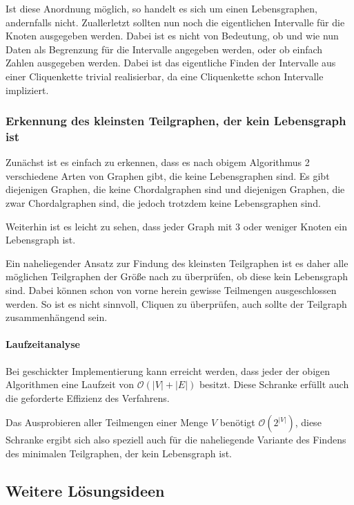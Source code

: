 Ist diese Anordnung möglich, so handelt es sich um einen Lebensgraphen, andernfalls nicht.
Zuallerletzt sollten nun noch die eigentlichen Intervalle für die Knoten ausgegeben werden. Dabei ist es nicht von Bedeutung, ob und wie nun Daten als Begrenzung für die Intervalle angegeben werden, oder ob einfach Zahlen ausgegeben werden. Dabei ist das eigentliche Finden der Intervalle aus einer Cliquenkette trivial realisierbar,
 da eine Cliquenkette schon Intervalle impliziert.
 
\subsubsection{Erkennung des kleinsten Teilgraphen, der kein Lebensgraph ist} 

Zunächst ist es einfach zu erkennen, dass es nach obigem Algorithmus 2 verschiedene Arten von Graphen gibt, die keine Lebensgraphen sind. Es gibt diejenigen Graphen, die keine Chordalgraphen sind und diejenigen Graphen, die zwar Chordalgraphen sind, die jedoch trotzdem keine Lebensgraphen sind.

Weiterhin ist es leicht zu sehen, dass jeder Graph mit 3 oder weniger Knoten ein Lebensgraph ist.

Ein naheliegender Ansatz zur Findung des kleinsten Teilgraphen ist es daher alle möglichen Teilgraphen der Größe nach zu überprüfen, ob diese kein Lebensgraph sind. Dabei können schon von vorne herein gewisse Teilmengen ausgeschlossen werden. So ist es nicht sinnvoll, Cliquen zu überprüfen, auch sollte der Teilgraph zusammenhängend sein.

 
\paragraph{Laufzeitanalyse}

Bei geschickter Implementierung kann erreicht werden, dass jeder der obigen Algorithmen eine Laufzeit von $\mathcal{O}(|V| + |E|)$ besitzt. Diese Schranke erfüllt auch die geforderte Effizienz des Verfahrens.

Das Ausprobieren aller Teilmengen einer Menge $V$ benötigt $\mathcal{O}(2^{|V|})$, diese Schranke ergibt sich also speziell auch für die naheliegende Variante des Findens des minimalen Teilgraphen, der kein Lebensgraph ist.

\subsection{Weitere Lösungsideen}


